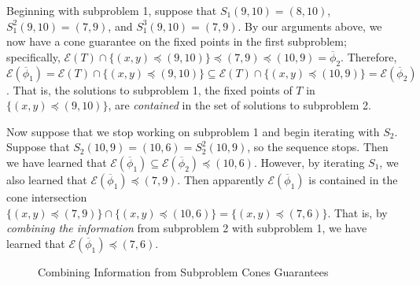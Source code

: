 \documentclass[11pt,reqno]{amsart}
\theoremstyle{definition}
\numberwithin{equation}{section}
\newcommand{\ol}{\overline}
\newcommand{\pre}{\phi}
\newcommand{\sub}{\subseteq}
\newcommand{\fix}{\mathcal{E}}
\newcommand{\peq}{\preceq}
\newcommand{\toppre}{\ol{\pre}}
\begin{document}
Beginning with subproblem 1, suppose that $S_1 (9,10) = (8,10)$, $S_1^2 (9,10) = (7,9)$, and $S_1^3 (9,10) = (7,9)$.
By our arguments above, we now have a cone guarantee on the fixed points in the first subproblem; specifically, $\fix(T) \cap \{(x,y) \peq (9,10)\} \peq (7,9) \peq (10,9) = \toppre_2$.
Therefore, $\fix(\toppre_1) = \fix(T) \cap \{(x,y) \peq (9,10)\} \sub \fix(T) \cap \{(x,y) \peq (10,9)\} = \fix(\toppre_2)$. 
That is, the solutions to subproblem 1, the fixed points of $T$ in $\{(x,y) \peq (9,10)\}$, are \emph{contained} in the set of solutions to subproblem 2. 

Now suppose that we stop working on subproblem 1 and begin iterating with $S_2$.
Suppose that $S_2(10,9) = (10,6) = S_2^2(10,9)$, so the sequence stops.
Then we have learned that $\fix(\toppre_1) \sub \fix(\toppre_2) \peq (10,6)$. 
However, by iterating $S_1$, we also learned that $\fix(\toppre_1) \peq (7,9)$. 
Then apparently $\fix(\toppre_1)$ is contained in the cone intersection $\{(x,y) \peq (7,9)\} \cap \{(x,y) \peq (10, 6)\} = \{(x,y) \peq (7,6) \}$. 
That is, by \emph{combining the information} from subproblem 2 with subproblem 1, we have learned that $\fix(\toppre_1) \peq (7,6)$. 

\begin{figure} \label{fig:rectangles}
\caption{Combining Information from Subproblem Cones Guarantees}
\end{figure}
\end{document}

